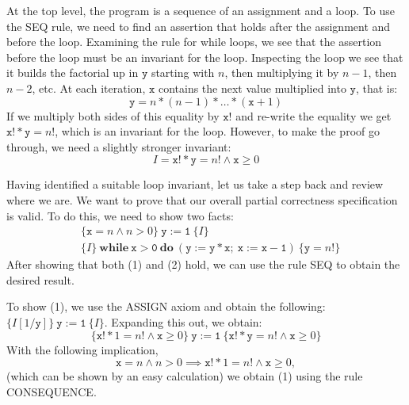 At the top level, the program is a sequence of an assignment and a loop. To use the SEQ rule,
we need to find an assertion that holds after the assignment and before the loop. Examining the
rule for while loops, we see that the assertion before the loop must be an invariant for the
loop. Inspecting the loop we see that it builds the factorial up in $\mathtt{y}$ starting with
$n$, then multiplying it by $n - 1$, then $n - 2$, etc. At each iteration, $\mathtt{x}$
contains the next value multiplied into $\mathtt{y}$, that is:
\[
\mathtt{y} = n * (n - 1) * \ldots * (\mathtt{x} + 1)
\]
If we multiply both sides of this equality by $\mathtt{x}!$ and re-write the equality we get
$\mathtt{x}! * \mathtt{y} = n!$, which is an invariant for the loop. However, to make the proof
go through, we need a slightly stronger invariant:
\[
I = \mathtt{x}! * \mathtt{y} = n! \wedge \mathtt{x} \geq 0
\]

Having identified a suitable loop invariant, let us take a step back and review where we are.
We want to prove that our overall partial correctness specification is valid. To do this, we
need to show two facts:
\begin{align}
&\{\mathtt{x} = n \wedge n > 0\}\ \mathtt{y := 1}\ \{I\} \\
&\{I\}\ \mathbf{while}\ \mathtt{x > 0}\ \mathbf{do}\ (\mathtt{y := y * x;\ x := x - 1})\
\{\mathtt{y} = n!\}
\end{align}
After showing that both (1) and (2) hold, we can use the rule SEQ to obtain the desired result.

To show (1), we use the ASSIGN axiom and obtain the following: $\{I[1/\mathtt{y}]\}\ \mathtt{y
:= 1}\ \{I\}$. Expanding this out, we obtain:
\[
\{\mathtt{x}! * 1 = n! \wedge \mathtt{x} \geq 0\}\ \mathtt{y := 1}\ \{\mathtt{x}! * \mathtt{y}
= n! \wedge \mathtt{x} \geq 0\}
\]
With the following implication,
\[
\mathtt{x} = n \wedge n > 0 \implies \mathtt{x}! * 1 = n! \wedge \mathtt{x} \geq 0,
\]
(which can be shown by an easy calculation) we obtain (1) using the rule CONSEQUENCE.

